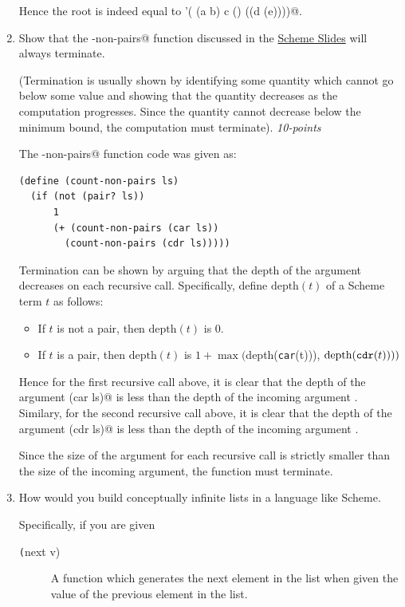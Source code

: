 \documentclass[12pt]{article}
\begin{document}
\begin{enumerate}
Hence the root is indeed equal to \verb@'( (a b) c () ((d (e))))@.
  
\item Show that the \verb@count-non-pairs@ function discussed in the
  \href{http://zdu.binghamton.edu/cs571-16f/slides/scheme/scheme.pdf}{Scheme Slides} will always terminate. 

(Termination is usually shown by identifying some quantity which
  cannot go below some value and showing that the quantity decreases
  as the computation progresses. Since the quantity cannot decrease
  below the minimum bound, the computation must
  terminate). \hfill{\textit{10-points}}

  The \verb@count-non-pairs@ function code was given as:

\begin{verbatim}
(define (count-non-pairs ls)
  (if (not (pair? ls))
      1
      (+ (count-non-pairs (car ls))
	    (count-non-pairs (cdr ls)))))
\end{verbatim}

Termination can be shown by arguing that the depth of the argument
decreases on each recursive call.  Specifically, define 
$\mbox{depth}(t)$ of a Scheme term $t$ as follows:
\begin{itemize}
\item If $t$ is not a pair, then $\mbox{depth}(t)$ is 0.
  \item If $t$ is a pair, then $\mbox{depth}(t)$ is $1 + \max($\mbox{depth}(\mbox{\texttt{car}}(t))), $\mbox{depth}(\mbox{\texttt{cdr}}(t))))$
\end{itemize}

Hence for the first recursive call above, it is clear that the depth
of the argument \verb@(car ls)@ is less than the depth of the incoming
argument \verb@ls@.  Similary, for the second recursive call above, it
is clear that the depth of the argument \verb@(cdr ls)@ is less than
the depth of the incoming argument \verb@ls@.

Since the size of the argument for each recursive call is strictly
smaller than the size of the incoming argument, the function must
terminate.

\item How would you build conceptually infinite lists in a language
  like Scheme.  

  Specifically, if you are given

\begin{description}

\item[\texttt(next v)] 
A function which generates the next element
 in the list when given the value \verb@v@ of the previous element in
 the list.


\end{description}
\end{enumerate}
\end{document}
